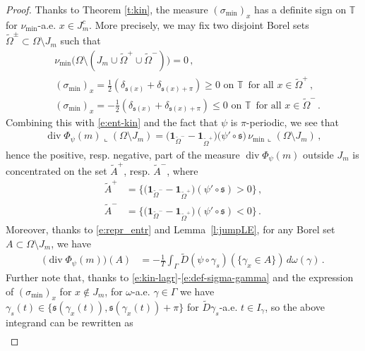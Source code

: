 \documentclass[fleqn
]{article}
\numberwithin{equation}{section}
\newcommand{\T}{{\mathbb T}}
\DeclareMathOperator{\dv}{div}
\theoremstyle{definition}
\begin{document}
\begin{proof}
Thanks to Theorem \ref{t:kin}, the measure $(\sigma_{\min})_x$ has a definite sign on $\T$ for $\nu_{\min}$-a.e. $x \in J_m^c$.
More precisely, we may fix two disjoint Borel sets 
$\tilde\Omega^\pm\subset\Omega\setminus J_m$
such that 
\begin{align*}
&\nu_{\min}\big(\Omega\setminus (J_m\cup\tilde\Omega^+\cup\tilde\Omega^-)\big)=0\,,\\
&
(\sigma_{\min})_x  
=  \frac 12 \left( \delta_{\mathfrak s(x)}+ \delta_{\mathfrak s(x)+ \pi}\right)
\geq 0 \text{ on }\T\, \text{ for all }x\in\tilde\Omega^+\,,\\
&
(\sigma_{\min})_x 
=
-  \frac 12 \left( \delta_{\mathfrak s(x)}+ \delta_{\mathfrak s(x)+ \pi}\right)
\leq 0 \text{ on }\T\, \text{ for all }x\in\tilde\Omega^-\,.
\end{align*}
Combining this with \eqref{e:ent-kin} and the fact that $\psi$ is $\pi$-periodic, we see that
\begin{align*}
\dv\Phi_\psi(m)\llcorner (\Omega\setminus J_m)
=\big(\mathbf 1_{\tilde\Omega^-}-\mathbf 1_{\tilde\Omega^+}\big) \big(\psi'\circ \mathfrak s \big) \, \nu_{\min}\llcorner (\Omega\setminus J_m)\,,
\end{align*}
hence the positive, resp. negative, part of the measure
 $\dv\Phi_\psi(m)$ outside $J_m$ is concentrated on the set
 $\tilde A^+$, resp. $\tilde A^-$, where
 \begin{align*}
\tilde A^+ 
&
= \big\lbrace (\mathbf 1_{\tilde\Omega^-}-\mathbf 1_{\tilde\Omega^+}\big) (\psi'\circ \mathfrak s )>0\big\rbrace\,,
\\
\tilde A^- 
&
= \big\lbrace (\mathbf 1_{\tilde\Omega^-}-\mathbf 1_{\tilde\Omega^+}\big) (\psi'\circ \mathfrak s ) < 0\big\rbrace
\,.
 \end{align*} 
Moreover, thanks to \eqref{e:repr_entr} and Lemma~\ref{l:jumpLE}, for any Borel set $A\subset\Omega\setminus J_m$, we have
\begin{align*}
\big(\dv\Phi_\psi(m)\big) (A)
&=-\frac 1T \int_\Gamma \tilde D(\psi\circ \gamma_s)(\lbrace \gamma_x\in A\rbrace)\, d\omega(\gamma)\,.
\end{align*}
Further note that, thanks to  \eqref{e:kin-lagr}-\eqref{e:def-sigma-gamma} and the expression of 
$(\sigma_{\min} )_x$ for $x\notin J_m$,
for $\omega$-a.e. $\gamma\in\Gamma$
 we have
$\gamma_s(t)\in\lbrace \mathfrak s(\gamma_x(t)),\mathfrak s(\gamma_x(t))+\pi\rbrace$  for $\tilde D\gamma_s$-a.e. $t\in I_\gamma$, so the above integrand can be rewritten as
\begin{align*}

\end{align*}
\end{proof}
\end{document}
